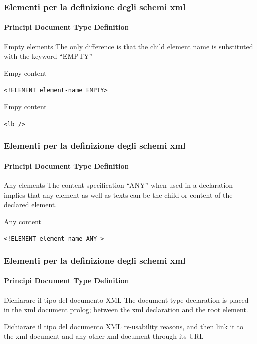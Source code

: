 \begin{frame}
    \frametitle{Elementi per la definizione degli schemi xml}
    \framesubtitle{Principi Document Type Definition}
    \addtocounter{nframe}{1}

    \begin{block}{Empty elements}
    The only difference is that the child element name is substituted with the keyword “EMPTY”  
    \end{block}

    \begin{block}{Empy content}
    \begin{center}\texttt{<!ELEMENT element-name EMPTY>}\end{center}
    \end{block}


    \begin{block}{Empy content}
    \begin{center}\texttt{<lb />}\end{center}
    \end{block}

\end{frame}


\begin{frame}
    \frametitle{Elementi per la definizione degli schemi xml}
    \framesubtitle{Principi Document Type Definition}
    \addtocounter{nframe}{1}

    \begin{block}{Any elements}
 The content specification ``ANY'' when used in a declaration implies that any element as well as texts can be the child or content of the declared element.

    \end{block}

    \begin{block}{Any content}
    \begin{center}\texttt{<!ELEMENT element-name ANY >}\end{center}
    \end{block}
    
\end{frame}


\begin{frame}
    \frametitle{Elementi per la definizione degli schemi xml}
    \framesubtitle{Principi Document Type Definition}
    \addtocounter{nframe}{1}

    \begin{block}{Dichiarare il tipo del documento XML}
        The document type declaration is placed in the xml document prolog; between
         the xml declaration and the root element.

    \end{block}

    \begin{block}{Dichiarare il tipo del documento XML}
        re-usability reasons, and then link it to the xml document and any other xml document through its URL
    \end{block}

\end{frame}

